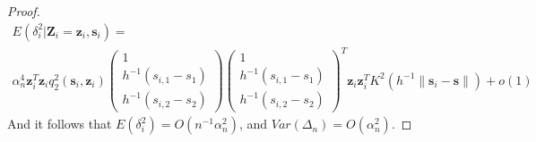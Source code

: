 \documentclass[authoryear,review, 12pt]{elsarticle}
\begin{document}
\begin{proof}
\begin{multline*}
E\left(\delta_{i}^{2}|\bm{Z}_{i}=\bm{z}_{i},\bm{s}_{i}\right)=\\
\alpha_{n}^{4}\bm{z}_{i}^{T}\bm{z}_{i}q_{2}^{2}(\bm{s}_{i},\bm{z}_{i})\left(\begin{array}{c}
1\\
h^{-1}(s_{i,1}-s_{1})\\
h^{-1}(s_{i,2}-s_{2})
\end{array}\right)\left(\begin{array}{c}
1\\
h^{-1}(s_{i,1}-s_{1})\\
h^{-1}(s_{i,2}-s_{2})
\end{array}\right)^{T}\bm{z}_{i}\bm{z}_{i}^{T}K^{2}\left(h^{-1}\|\bm{s}_{i}-\bm{s}\|\right)+o\left(1\right)
\end{multline*}
And it follows that $E\left(\delta_{i}^{2}\right)=O\left(n^{-1}\alpha_{n}^{2}\right)$,
and $Var\left(\Delta_{n}\right)=O\left(\alpha_{n}^{2}\right)$.
\end{proof}
\end{document}
